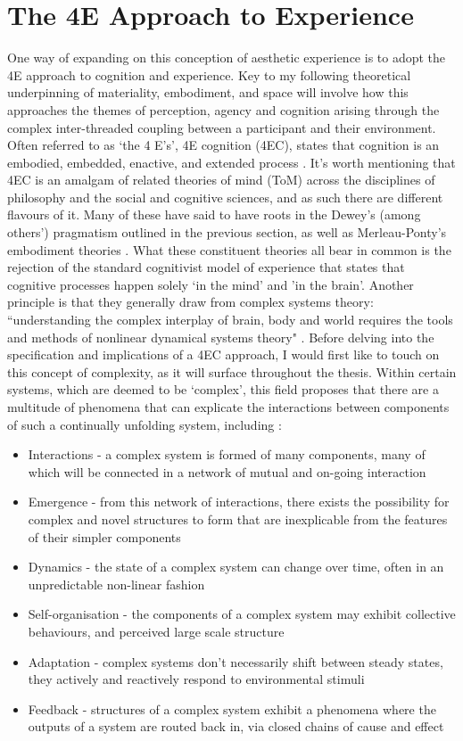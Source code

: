 \section{The 4E Approach to Experience}\label{sec: theory-4e}
One way of expanding on this conception of aesthetic experience is to adopt the 4E approach to cognition and experience. Key to my following theoretical underpinning of materiality, embodiment, and space will involve how this approaches the themes of perception, agency and cognition arising through the complex inter-threaded coupling between a participant and their environment. Often referred to as `the 4 E's', 4E cognition (4EC), states that cognition is an embodied, embedded, enactive, and extended process \citep{gallagher2017}. It's worth mentioning that 4EC is an amalgam of related theories of mind (ToM) across the disciplines of philosophy and the social and cognitive sciences, and as such there are different flavours of it. Many of these have said to have roots in the Dewey's (among others') pragmatism outlined in the previous section, as well as Merleau-Ponty's embodiment theories \citep{zavota2016}. What these constituent theories all bear in common is the rejection of the standard cognitivist model of experience that states that cognitive processes happen solely `in the mind' and 'in the brain'. Another principle is that they generally draw from complex systems theory: ``understanding the complex interplay of brain, body and world requires the tools and methods of nonlinear dynamical systems theory" \citep{clark1999}. Before delving into the specification and implications of a 4EC approach, I would first like to touch on this concept of complexity, as it will surface throughout the thesis. Within certain systems, which are deemed to be `complex', this field proposes that there are a multitude of phenomena that can explicate the interactions between components of such a continually unfolding system, including \citep{dedomenico2019}:
\begin{itemize}
    \item Interactions - a complex system is formed of many components, many of which will be connected in a network of mutual and on-going interaction
    \item Emergence - from this network of interactions, there exists the possibility for complex and novel structures to form that are inexplicable from the features of their simpler components 
    \item Dynamics - the state of a complex system can change over time, often in an unpredictable non-linear fashion
    \item Self-organisation - the components of a complex system may exhibit collective behaviours, and perceived large scale structure
    \item Adaptation - complex systems don't necessarily shift between steady states, they actively and reactively respond to environmental stimuli
    \item Feedback - structures of a complex system exhibit a phenomena where the outputs of a system are routed back in, via closed chains of cause and effect 
\end{itemize}
